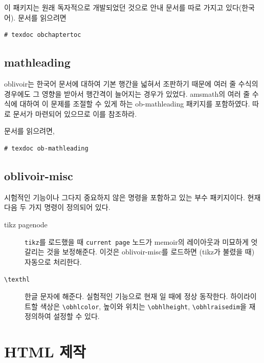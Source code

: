 \documentclass[
	12pt,
	a4paper,
	kosection,
	footnote,
	nobookmarks,
	microtype,
	figtabcapt,
]{oblivoir}
\def\cs#1{\texttt{\textbackslash #1}}
\begin{document}
\begin{boxedverbatim}
\usepackage{obchaptertoc}
\chaptertoc
\end{boxedverbatim}

이 패키지는 원래 독자적으로 개발되었던 것으로 안내 문서를 따로 가지고 있다(한국어).
문서를 읽으려면
\begin{verbatim}
# texdoc obchaptertoc
\end{verbatim}

\subsection{mathleading}

oblivoir는 한국어 문서에 대하여 기본 행간을 넓혀서 조판하기 때문에 여러 줄 수식의 경우에도
그 영향을 받아서 행간격이 늘어지는 경우가 있었다.
\textsf{amsmath}의 여러 줄 수식에 대하여 이 문제를 조절할 수 있게 하는 \textsf{ob-mathleading}
패키지를 포함하였다. 따로 문서가 마련되어 있으므로 이를 참조하라.

\begin{boxedverbatim}
\usepackage{ob-mathleading}
\end{boxedverbatim}

문서를 읽으려면,
\begin{verbatim}
# texdoc ob-mathleading
\end{verbatim}

\subsection{oblivoir-misc}

시험적인 기능이나 그다지 중요하지 않은 명령을 포함하고 있는 
부수 패키지이다. 현재 다음 두 가지 명령이 정의되어 있다.

\begin{description}
\item[tikz pagenode] \texttt{tikz}를 로드했을 때 \texttt{current page}
노드가 memoir의 레이아웃과 미묘하게 엇갈리는 것을 보정해준다. 이것은 oblivoir-misc를 로드하면 (tikz가 불렸을 때) 자동으로 처리한다.
\item[\cs{texthl}] 한글 문자에 해준다. 실험적인 기능으로
현재 \XeLaTeX 일 때에 정상 동작한다. 하이라이트할 색상은 \cs{obhlcolor}, 높이와
위치는 \cs{obhlheight}, \cs{obhlraisedim}을 재정의하여 설정할 수 있다.
\end{description}


\section{HTML 제작}
\end{document}
